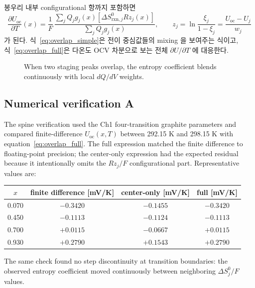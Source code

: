 \documentclass[11pt,a4paper]{article}
\newcommand{\rxn}{\mathrm{rxn}}
\newcommand{\oc}{\mathrm{oc}}
\begin{document}
봉우리 내부 configurational 항까지 포함하면
\begin{equation}
\boxed{\;
\frac{\partial U_\oc}{\partial T}(x)
=\frac{1}{F}\,
\frac{\sum_j Q_jg_j(x)\left[\Delta S^0_{\rxn,j}
Rz_j(x)\right]}
{\sum_j Q_jg_j(x)},\qquad
z_j=\ln\frac{\xi_j}{1-\xi_j}
=\frac{U_\oc-U_j}{w_j}
\;}
\label{eq:overlap_full}
\end{equation}
가 된다. 식~\eqref{eq:overlap_simple}은 전이 중심값들의 mixing 을 보여주는
식이고, 식~\eqref{eq:overlap_full}은 다온도 OCV 차분으로 보는 전체
$\partial U/\partial T$ 에 대응한다.

\begin{figure}[t]
\centering
{}
\caption{When two staging peaks overlap, the entropy coefficient blends continuously with local $dQ/dV$ weights.}
\label{fig:overlap}
\end{figure}

\subsection{Numerical verification A}
The spine verification used the Ch1 four-transition graphite parameters and compared
finite-difference $U_\oc(x,T)$ between 292.15 K and 298.15 K with
equation~\eqref{eq:overlap_full}. The full expression matched the finite difference to
floating-point precision; the center-only expression had the expected residual because it
intentionally omits the $Rz_j/F$ configurational part. Representative values are:
\begin{center}
\small
\begin{tabular}{c c c c}
\toprule
$x$ & finite difference [mV/K] & center-only [mV/K] & full [mV/K]\\
\midrule
0.070 & $-0.3420$ & $-0.1455$ & $-0.3420$\\
0.450 & $-0.1113$ & $-0.1124$ & $-0.1113$\\
0.700 & $+0.0115$ & $-0.0667$ & $+0.0115$\\
0.930 & $+0.2790$ & $+0.1543$ & $+0.2790$\\
\bottomrule
\end{tabular}
\end{center}
The same check found no step discontinuity at transition boundaries: the observed
entropy coefficient moved continuously between neighboring $\Delta S^0_j/F$ values.
\end{document}

